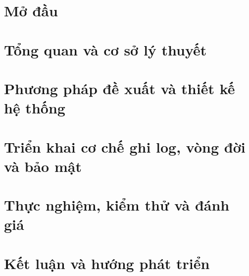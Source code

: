 \documentclass{template/thesis}
\begin{document}
\firstbeforepreface
\secondbeforepreface
\setcounter{page}{1}
\newpage
\afterpreface


\clearpage

\chapter{Mở đầu}
\label{c:intro}


\chapter{Tổng quan và cơ sở lý thuyết}
\label{c:cosolythuyet}


\chapter{Phương pháp đề xuất và thiết kế hệ thống}
\label{ch:proposed}


\chapter{Triển khai cơ chế ghi log, vòng đời và bảo mật}
\label{c:implementation}


\chapter{Thực nghiệm, kiểm thử và đánh giá}
\label{c:evaluation}



\chapter{Kết luận và hướng phát triển}
\label{c:conclusion}



% 

\begingroup
\setlength{\emergencystretch}{8em}
\justifying\printbibliography[title=Tài liệu tham khảo]
\endgroup
{}

\appendix
\renewcommand{\cftchappresnum}{Phụ lục }
\addtocontents{toc}{\protect\renewcommand{\protect\cftchappresnum}{Phụ lục }}

\end{document}
